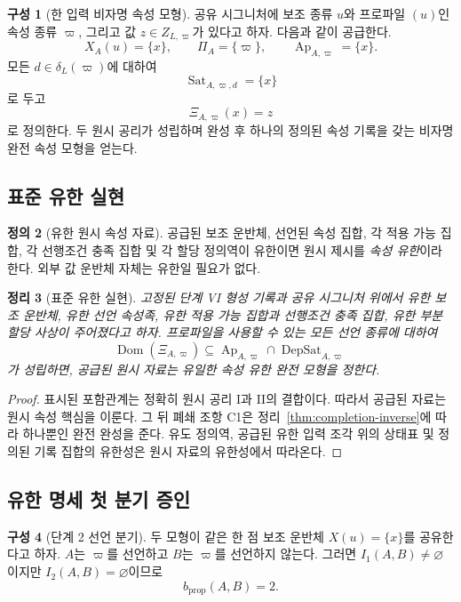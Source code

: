\documentclass[11pt]{article}
\newcommand{\Ap}{\operatorname{Ap}}
\newcommand{\DepSat}{\operatorname{DepSat}}
\newcommand{\Sat}{\operatorname{Sat}}
\newcommand{\Dom}{\operatorname{Dom}}
\newtheorem{theorem}{정리}[section]
\theoremstyle{definition}
\newtheorem{definition}[theorem]{정의}
\newtheorem{construction}[theorem]{구성}
\theoremstyle{remark}
\begin{document}
\begin{construction}[한 입력 비자명 속성 모형]
공유 시그니처에 보조 종류 \(u\)와 프로파일 \((u)\)인 속성 종류 \(\varpi\), 그리고 값 \(z\in Z_{L,\varpi}\)가 있다고 하자.
다음과 같이 공급한다.
\[
X_A(u)=\{x\},
\qquad
\Pi_A=\{\varpi\},
\qquad
\Ap_{A,\varpi}=\{x\}.
\]
모든 \(d\in\delta_L(\varpi)\)에 대하여
\[
\Sat_{A,\varpi,d}=\{x\}
\]
로 두고
\[
\Xi_{A,\varpi}(x)=z
\]
로 정의한다.
두 원시 공리가 성립하며 완성 후 하나의 정의된 속성 기록을 갖는 비자명 완전 속성 모형을 얻는다.
\end{construction}

\subsection{표준 유한 실현}

\begin{definition}[유한 원시 속성 자료]
공급된 보조 운반체, 선언된 속성 집합, 각 적용 가능 집합, 각 선행조건 충족 집합 및 각 할당 정의역이 유한이면 원시 제시를 \emph{속성 유한}이라 한다.
외부 값 운반체 자체는 유한일 필요가 없다.
\end{definition}

\begin{theorem}[표준 유한 실현]
\label{thm:finite-realization}
고정된 단계 VI 형성 기록과 공유 시그니처 위에서 유한 보조 운반체, 유한 선언 속성족, 유한 적용 가능 집합과 선행조건 충족 집합, 유한 부분 할당 사상이 주어졌다고 하자.
프로파일을 사용할 수 있는 모든 선언 종류에 대하여
\[
\Dom(\Xi_{A,\varpi})
\subseteq
\Ap_{A,\varpi}\cap\DepSat_{A,\varpi}
\]
가 성립하면, 공급된 원시 자료는 유일한 속성 유한 완전 모형을 정한다.
\end{theorem}

\begin{proof}
표시된 포함관계는 정확히 원시 공리 I과 II의 결합이다.
따라서 공급된 자료는 원시 속성 핵심을 이룬다.
그 뒤 폐쇄 조항 C1은 정리~\ref{thm:completion-inverse}에 따라 하나뿐인 완전 완성을 준다.
유도 정의역, 공급된 유한 입력 조각 위의 상태표 및 정의된 기록 집합의 유한성은 원시 자료의 유한성에서 따라온다.
\end{proof}

\subsection{유한 명세 첫 분기 증인}

\begin{construction}[단계 2 선언 분기]
두 모형이 같은 한 점 보조 운반체 \(X(u)=\{x\}\)를 공유한다고 하자.
\(A\)는 \(\varpi\)를 선언하고 \(B\)는 \(\varpi\)를 선언하지 않는다.
그러면 \(I_1(A,B)\neq\varnothing\)이지만 \(I_2(A,B)=\varnothing\)이므로
\[
b_{\mathrm{prop}}(A,B)=2.
\]
\end{construction}
\end{document}
